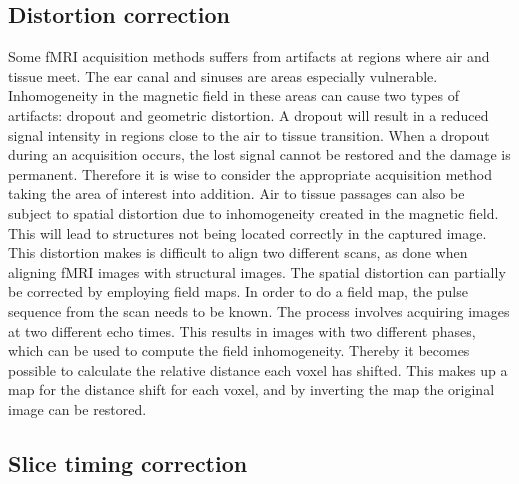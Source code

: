 \subsection{Distortion correction}

Some fMRI acquisition methods suffers from artifacts at regions where air and tissue meet. The ear canal and sinuses are areas especially vulnerable. Inhomogeneity in the magnetic field in these areas can cause two types of artifacts: dropout and geometric distortion. A dropout will result in a reduced signal intensity in regions close to the air to tissue transition. When a dropout during an acquisition occurs, the lost signal cannot be restored and the damage is permanent. Therefore it is wise to consider the appropriate acquisition method taking the area of interest into addition. Air to tissue passages can also be subject to spatial distortion due to inhomogeneity created in the magnetic field. This will lead to structures not being located correctly in the captured image. This distortion makes is difficult to align two different scans, as done when aligning fMRI images with structural images. 
The spatial distortion can partially be corrected by employing field maps. In order to do a field map, the pulse sequence from the scan needs to be known. The process involves acquiring images at two different echo times. This results in images with two different phases, which can be used to compute the field inhomogeneity. Thereby it becomes possible to calculate the relative distance each voxel has shifted. This makes up a map for the distance shift for each voxel, and by inverting the map the original image can be restored.\cite{Poldrack2011}  

\subsection{Slice timing correction} 

